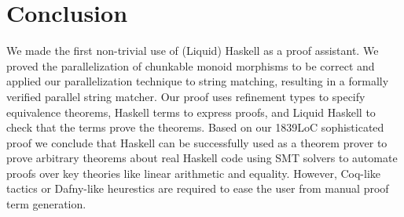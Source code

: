 \section{Conclusion}\label{sec:stringmatcher:conclusion}
We made the first non-trivial use of (Liquid) Haskell as a proof
assistant. 
We proved the parallelization of chunkable monoid
morphisms to be correct
and applied our parallelization technique to string matching,
resulting in a formally verified parallel string matcher.
%
Our proof uses refinement types to specify
equivalence theorems,
Haskell terms to express proofs,
and Liquid Haskell to check that the terms prove the theorems.
%
Based on our 1839LoC sophisticated proof we conclude that
Haskell can be successfully used as a theorem prover
to prove arbitrary theorems about real Haskell code
using SMT solvers to automate proofs
over key theories like linear arithmetic and equality.
%
However, Coq-like tactics or Dafny-like heurestics are required
to ease the user from manual proof term generation.


\begin{comment}
  - lines of code
  - interaction of proofs with code
        no interaction: the main proof
        invariant good indices are requied to prove that
           if target it bigger than input then indices is empty
           proof oof good indexing requires casting
   - proof reuse
   - trust library factions with assume annotations
\end{comment}
